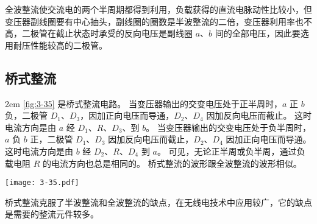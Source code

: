 全波整流使交流电的两个半周期都得到利用，负载获得的直流电脉动性比较小，但变压器副线圈要有中心抽头，副线圈的圈数是半波整流的二倍，变压器利用率也不高，二极管在截止状态时承受的反向电压是副线圈 $a$、$b$ 间的全部电压，因此要选用耐压性能较高的二极管。

\subsection{桥式整流}
\medskip\noindent
\begin{minipage}{0.58\linewidth}\parindent2em
  \cref{fig:3-35} 是桥式整流电路。
  当变压器输出的交变电压处于正半周时，$a$ 正 $b$ 负，二极管 $D_1$、$D_3$，因加正向电压而导通，$D_2$、$D_4$ 因加反向电压而截止。
  这时电流方向是由 $a$ 经 $D_1$、$R$、$D_3$、到 $b$。
  当变压器输出的交变电压处于负半周时，$a$ 负 $b$ 正，二极管 $D_1$、$D_3$ 因加反向电压而截止，$D_2$、$D_4$ 因加正向电压而导通。
  这时电流方向是由 $b$ 经 $D_2$、$R$、$D_4$ 到 $a$。
  可见，无论正半周或负半周，通过负载电阻 $R$ 的电流方向也总是相同的。
  桥式整流的波形跟全波整流的波形相似。
\end{minipage}\hfill
\begin{minipage}{0.4\linewidth}\centering
\begin{figurehere}
  \texttt{[image: 3-35.pdf]}
  \caption{}\label{fig:3-35}
\end{figurehere}
\end{minipage}

\medskip
桥式整流克服了半波整流和全波整流的缺点，在无线电技术中应用较广，它的缺点是需要的整流元件较多。

